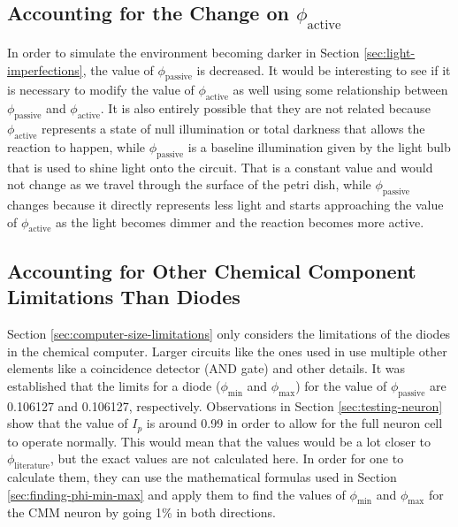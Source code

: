 \subsection{Accounting for the Change on $\phi_{\text{active}}$}
In order to simulate the environment becoming darker in Section \ref{sec:light-imperfections}, the value of $\phi_{\text{passive}}$ is decreased.
It would be interesting to see if it is necessary to modify the value of $\phi_{\text{active}}$ as well using some relationship between
$\phi_{\text{passive}}$ and $\phi_{\text{active}}$.
It is also entirely possible that they are not related because $\phi_{\text{active}}$ represents a state of null illumination or total darkness that allows the reaction to happen, while $\phi_{\text{passive}}$ is a baseline illumination given by the light bulb 
that is used to shine light onto the circuit. That is a constant value and would not change as we travel through the surface of the petri dish, while $\phi_{\text{passive}}$ changes 
because it directly represents less light and starts approaching the value of $\phi_{\text{active}}$ as the light becomes dimmer and the reaction becomes more active.


\subsection{Accounting for Other Chemical Component Limitations Than Diodes} \label{sec:other-components}
Section \ref{sec:computer-size-limitations} only considers the limitations of the diodes in the chemical computer.
Larger circuits like the ones used in \cite{stovold2017reaction} use multiple other elements like a coincidence detector (AND gate) and other details.
It was established that the limits for a diode ($\phi_{\text{min}}$ and $\phi_{\text{max}}$) for the value of $\phi_{\text{passive}}$ are 0.106127
and 0.106127, respectively. 
Observations in Section \ref{sec:testing-neuron} show that the value of $I_p$ is around 0.99 in order to allow for the full neuron cell to operate normally.
This would mean that the values would be a lot closer to $\phi_{\text{literature}}$, but the exact values are not calculated here. 
In order for one to calculate them, they can use the mathematical formulas used in Section \ref{sec:finding-phi-min-max} and apply them to find the values of $\phi_{\text{min}}$ and $\phi_{\text{max}}$ for the CMM neuron
by going 1\% in both directions.

